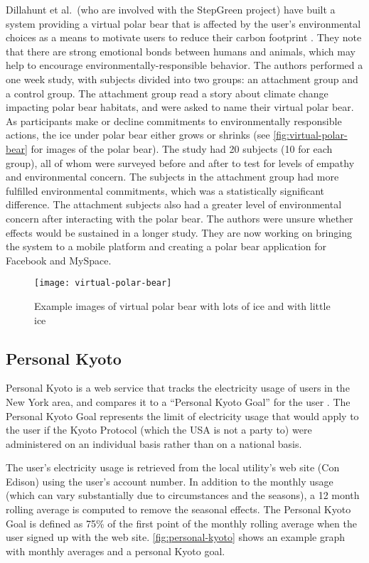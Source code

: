 Dillahunt et al.\ (who are involved with the StepGreen project) have built a system providing a virtual polar bear that is affected by the user's environmental choices as a means to motivate users to reduce their carbon footprint \cite{dillahunt-virtual-polar-bear-2008}. They note that there are strong emotional bonds between humans and animals, which may help to encourage environmentally-responsible behavior. The authors performed a one week study, with subjects divided into two groups: an attachment group and a control group. The attachment group read a story about climate change impacting polar bear habitats, and were asked to name their virtual polar bear. As participants make or decline commitments to environmentally responsible actions, the ice under polar bear either grows or shrinks (see \autoref{fig:virtual-polar-bear} for images of the polar bear). The study had 20 subjects (10 for each group), all of whom were surveyed before and after to test for levels of empathy and environmental concern. The subjects in the attachment group had more fulfilled environmental commitments, which was a statistically significant difference. The attachment subjects also had a greater level of environmental concern after interacting with the polar bear. The authors were unsure whether effects would be sustained in a longer study. They are now working on bringing the system to a mobile platform and creating a polar bear application for Facebook and MySpace.

\begin{figure}[htbp]
	\centering
		\texttt{[image: virtual-polar-bear]}
		\caption{Example images of virtual polar bear with lots of ice and with little ice}
		\label{fig:virtual-polar-bear}
\end{figure}


\subsection{Personal Kyoto}
\label{sec:personal-kyoto}

Personal Kyoto is a web service that tracks the electricity usage of users in the New York area, and compares it to a ``Personal Kyoto Goal'' for the user \cite{Personal-Kyoto-website}. The Personal Kyoto Goal represents the limit of electricity usage that would apply to the user if the Kyoto Protocol (which the USA is not a party to) were administered on an individual basis rather than on a national basis.

The user's electricity usage is retrieved from the local utility's web site (Con Edison) using the user's account number. In addition to the monthly usage (which can vary substantially due to circumstances and the seasons), a 12 month rolling average is computed to remove the seasonal effects. The Personal Kyoto Goal is defined as 75\% of the first point of the monthly rolling average when the user signed up with the web site. \autoref{fig:personal-kyoto} shows an example graph with monthly averages and a personal Kyoto goal.

